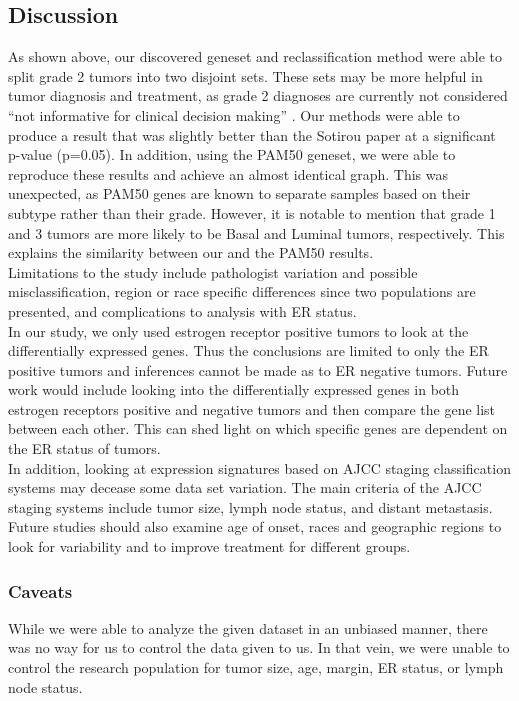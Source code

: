 \documentclass[a4paper,10pt]{article}
\begin{document}
\subsection{Discussion}
As shown above, our discovered geneset and reclassification method were 
able to split grade 2 tumors into two disjoint sets. These sets may be more 
helpful in tumor diagnosis and treatment, as grade 2 diagnoses are currently
 not considered “not informative for clinical decision making” \cite{Sotiriou1}.
Our methods were able to produce a result that was slightly better than the 
Sotirou paper at a significant p-value (p=0.05). In addition, using the PAM50
 geneset, we were able to reproduce these results and achieve an almost 
identical graph. This was unexpected, as PAM50 genes are known to 
separate samples based on their subtype rather than their grade. However, 
it is notable to mention that grade 1 and 3 tumors are more likely to be Basal 
and Luminal tumors, respectively. This explains the similarity between our 
and the PAM50 results.\\

Limitations to the study include pathologist variation and possible misclassification, region or 
race specific differences since two populations are presented, and complications to analysis with ER status. \\

In our study, we only used estrogen receptor positive tumors to look at the differentially 
expressed genes. Thus the conclusions are limited to only the ER positive tumors and 
inferences cannot be made as to ER negative tumors. Future work would include looking into the
 differentially expressed genes in both estrogen receptors positive and negative tumors and then
 compare the gene list between each other. This can shed light on which specific genes are dependent 
on the ER status of tumors. \\

In addition, looking at expression signatures based on AJCC staging classification systems 
may decease some data set variation. The main criteria of the AJCC staging 
systems include tumor size, lymph node status, and distant metastasis. Future studies should 
also examine age of onset, races and geographic regions to look for variability and to improve 
treatment for different groups.\\ 

\subsubsection{Caveats}
While we were able to analyze the given dataset in an unbiased manner, 
there was no way for us to control the data given to us. In that vein, we 
were unable to control the research population for tumor size, age, 
margin, ER status, or lymph node status.\\
\end{document}
